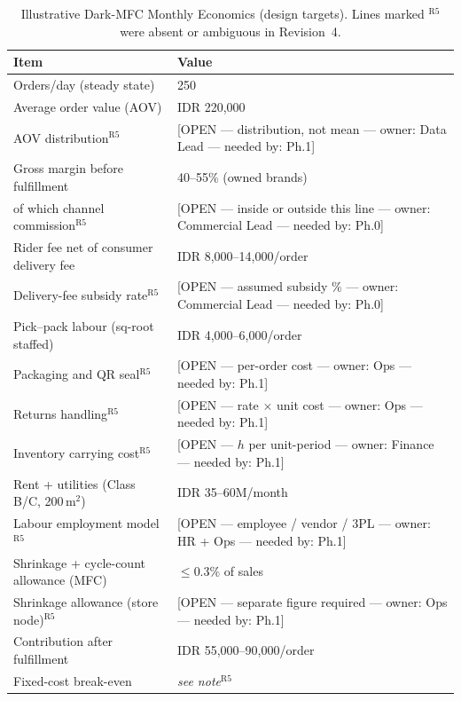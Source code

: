 \documentclass[10pt,twocolumn,letterpaper]{article}
\theoremstyle{definition}
\newcommand{\OPEN}[3]{{\color{openred}\footnotesize\textsf{[OPEN --- #1 --- owner: #2 --- needed by: #3]}}}
\begin{document}
\begin{table}[t]
\caption{Illustrative Dark-MFC Monthly Economics (design targets). Lines marked $^{\mathrm{R5}}$ were absent or ambiguous in Revision~4.}
\label{tab:econ}
\centering\footnotesize
\begin{tabular}{@{}p{4.6cm}p{3.3cm}@{}}
\toprule
\textbf{Item} & \textbf{Value}\\
\midrule
Orders/day (steady state) & 250\\
Average order value (AOV) & IDR 220,000\\
AOV distribution$^{\mathrm{R5}}$ & \OPEN{distribution, not mean}{Data Lead}{Ph.1}\\
Gross margin before fulfillment & 40--55\% (owned brands)\\
\quad of which channel commission$^{\mathrm{R5}}$ & \OPEN{inside or outside this line}{Commercial Lead}{Ph.0}\\
Rider fee net of consumer delivery fee & IDR 8,000--14,000/order\\
Delivery-fee subsidy rate$^{\mathrm{R5}}$ & \OPEN{assumed subsidy \%}{Commercial Lead}{Ph.0}\\
Pick--pack labour (sq-root staffed) & IDR 4,000--6,000/order\\
Packaging and QR seal$^{\mathrm{R5}}$ & \OPEN{per-order cost}{Ops}{Ph.1}\\
Returns handling$^{\mathrm{R5}}$ & \OPEN{rate $\times$ unit cost}{Ops}{Ph.1}\\
Inventory carrying cost$^{\mathrm{R5}}$ & \OPEN{$h$ per unit-period}{Finance}{Ph.1}\\
Rent + utilities (Class B/C, 200\,m$^2$) & IDR 35--60M/month\\
Labour employment model$^{\mathrm{R5}}$ & \OPEN{employee / vendor / 3PL}{HR + Ops}{Ph.1}\\
Shrinkage + cycle-count allowance (MFC) & $\le0.3\%$ of sales\\
Shrinkage allowance (store node)$^{\mathrm{R5}}$ & \OPEN{separate figure required}{Ops}{Ph.1}\\
\midrule
Contribution after fulfillment & IDR 55,000--90,000/order\\
Fixed-cost break-even & \emph{see note}$^{\mathrm{R5}}$\\
\bottomrule
\end{tabular}
\end{table}
\end{document}
